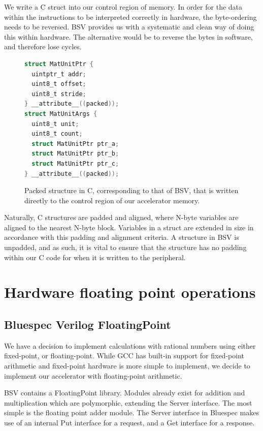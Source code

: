 \documentclass[a4paper,8pt]{report}
\begin{document}
We write a C struct into our control region of memory. In order for the data
within the instructions to be interpreted correctly in hardware, the
byte-ordering needs to be reversed. BSV provides us with a systematic and clean
way of doing this within hardware. The alternative would be to reverse the bytes
in software, and therefore lose cycles. \\

\begin{figure}[h]
  \centering 
  \scriptsize
\begin{lstlisting}[language=C,style=customc,xleftmargin=.3\textwidth]
struct MatUnitPtr {
  uintptr_t addr;
  uint8_t offset;
  uint8_t stride;
} __attribute__((packed));
struct MatUnitArgs {
  uint8_t unit;
  uint8_t count;
  struct MatUnitPtr ptr_a;
  struct MatUnitPtr ptr_b;
  struct MatUnitPtr ptr_c;
} __attribute__((packed));
\end{lstlisting}
  \normalsize
  \caption{Packed structure in C, corresponding to that of BSV, that is written directly to the
    control region of our accelerator memory. }
\end{figure}


Naturally, C structures are padded and aligned, where N-byte variables are
aligned to the nearest N-byte block. Variables in a struct are extended in size
in accordance with this padding and alignment criteria.
A structure in BSV is unpadded, and as such, it is vital to ensure that the
structure has no padding within our C code for when it is written to the
peripheral.


\section{Hardware floating point operations}
\subsection{Bluespec Verilog FloatingPoint}
We have a decision to implement calculations with rational numbers using either
fixed-point, or floating-point. While GCC has built-in support for fixed-point
arithmetic and fixed-point hardware is more simple to implement, we decide to
implement our accelerator with floating-point arithmetic.

BSV contains a FloatingPoint library. Modules already exist for addition and
multiplication which are polymorphic, extending the Server interface. The most
simple is the floating point adder module. The Server interface in Bluespec
makes use of an internal Put interface for a request, and a Get interface for a
response.
\end{document}
